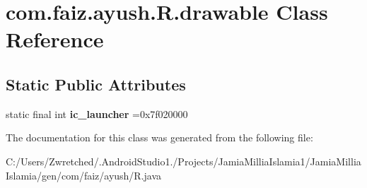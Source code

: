 \hypertarget{classcom_1_1faiz_1_1ayush_1_1_r_1_1drawable}{}\section{com.\+faiz.\+ayush.\+R.\+drawable Class Reference}
\label{classcom_1_1faiz_1_1ayush_1_1_r_1_1drawable}
\subsection*{Static Public Attributes}
\begin{DoxyCompactItemize}
\item 
\hypertarget{classcom_1_1faiz_1_1ayush_1_1_r_1_1drawable_ab8f841d8ebe2c1613c355b61f05f7b2f}{}static final int {\bfseries ic\+\_\+launcher} =0x7f020000\label{classcom_1_1faiz_1_1ayush_1_1_r_1_1drawable_ab8f841d8ebe2c1613c355b61f05f7b2f}

\end{DoxyCompactItemize}


The documentation for this class was generated from the following file\+:\begin{DoxyCompactItemize}
\item 
C\+:/\+Users/\+Zwretched/.\+Android\+Studio1./\+Projects/\+Jamia\+Millia\+Islamia1/\+Jamia\+Millia\+Islamia/gen/com/faiz/ayush/R.\+java\end{DoxyCompactItemize}
